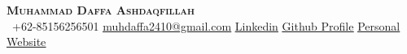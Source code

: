 \begin{center}
    \textbf{\Huge \scshape Muhammad Daffa Ashdaqfillah} \\ \vspace{1pt}
    \vspace{5pt} %
     \ \small +62-85156256501 \quad
    \href{mailto:muhdaffa2410@gmail.com}{ \underline{muhdaffa2410@gmail.com}} \quad
    \href{https://www.linkedin.com/in/daf2a}{ \underline{Linkedin}} \quad
    \href{https://github.com/daf2a}{ \underline{Github Profile}} \quad
    \href{https://daf2a.github.io}{ \underline{Personal Website}}
\end{center}